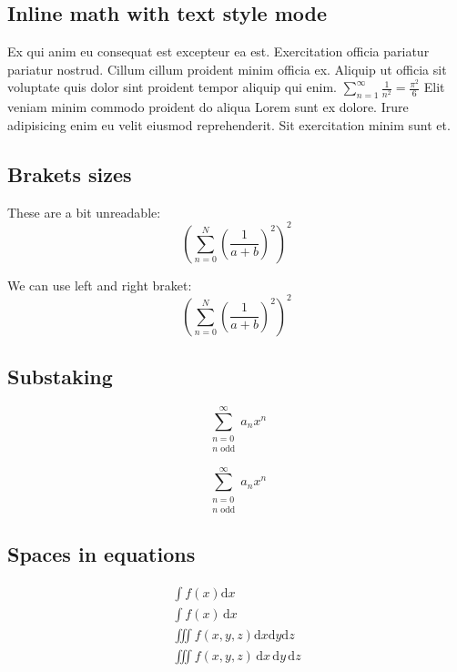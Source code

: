 \documentclass[12pt]{article}
\begin{document}
\subsection{Inline math with text style mode}

Ex qui anim eu consequat est excepteur ea est. Exercitation officia pariatur pariatur nostrud. Cillum cillum proident minim officia ex. Aliquip ut officia sit voluptate quis dolor sint proident tempor aliquip qui enim. $ \textstyle \sum_{n=1}^\infty \frac{1}{n^2} = \frac{\pi^2}{6} $ Elit veniam minim commodo proident do aliqua Lorem sunt ex dolore. Irure adipisicing enim eu velit eiusmod reprehenderit. Sit exercitation minim sunt et.

\subsection{Brakets sizes}

These are a bit unreadable:
\begin{equation*}
    ( \sum_{n=0}^N ( \frac{1}{a + b} )^2 )^2
\end{equation*}

\noindent We can use left and right braket:
\begin{equation*}
    \left( \sum_{n=0}^N \left( \frac{1}{a + b} \right)^2 \right)^2
\end{equation*}

\subsection{Substaking}

\begin{equation*}
    \sum_{\substack{n=0 \\ n \text{ odd}}}^\infty a_{n} x^n
\end{equation*}

\begin{equation*}
    \textstyle
    \sum_{\substack{n=0 \\ n \text{ odd}}}^\infty a_{n} x^n
\end{equation*}

\subsection{Spaces in equations}

\begin{align*}
    \int f(x) \mathrm{d}x \\
    \int f(x) \, \mathrm{d}x \\
    \iiint f(x,y,z) \mathrm{d}x \mathrm{d}y \mathrm{d}z \\
    \iiint f(x,y,z) \, \mathrm{d}x \, \mathrm{d}y \, \mathrm{d}z \\
\end{align*}
\end{document}
